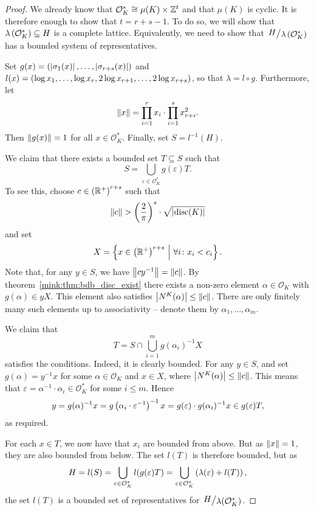 \begin{proof}
We already know that $\mathcal{O}_K^* \cong \mu(K) \times \mathbb{Z}^t$ and
that $\mu(K)$ is cyclic. It is therefore enough to show that
$t = r+s-1$. To do so, we will show that
$\lambda \left(\mathcal{O}_K^*\right) \subseteq H$ is a complete lattice.
Equivalently, we need to show that
$\kvoc{H}{\lambda \br{\mathcal{O}_K^*}}$ has a bounded system of
representatives.

Set $g(x) = \left(\left\lvert \sigma_1(x)\right\rvert, \dots, \left\lvert \sigma_{r+s}(x)\right\rvert\right)$
and
$l(x) =
\left(\log x_1, \dots, \log x_r,
2 \log x_{r+1}, \dots, 2 \log x_{r+s}\right)$, so that
$\lambda = l \circ g$. Furthermore, let
\[
\left\lVert x\right\rVert = \prod_{i=1}^r x_i \cdot \prod_{i=1}^s x_{r+i}^2.
\]
Then $\left\lVert g(x)\right\rVert = 1$ for all $x \in \mathcal{O}_K^*$. Finally,
set $S = l^{-1}(H)$.

We claim that there exists a bounded set $T \subseteq S$ such that
\[
S = \bigcup_{\varepsilon \in \mathcal{O}_K^*} g(\varepsilon) T.
\]
To see this, choose $c \in \left(\mathbb{R}^+\right)^{r+s}$ such that
\[
\left\lVert c\right\rVert > \left(\frac{2}{\pi}\right)^s \cdot \sqrt{\left\lvert \operatorname{disc}(K)\right\rvert}
\]
and set
\[
X = \left\{x \in \left(\mathbb{R}^+\right)^{r+s}~\middle\vert~\forall i \colon x_i < c_i\right\}.
\]
Note that, for any $y \in S$, we have $\left\lVert cy^{-1}\right\rVert = \left\lVert c\right\rVert$.
By theorem~\ref{mink:thm:bdb_disc_exist} there exists a non-zero
element $\alpha \in \mathcal{O}_K$ with $g(\alpha) \in yX$. This
element also satisfies $\left\lvert N^K(\alpha)\right\rvert \leq \left\lVert c\right\rVert$. There are
only finitely many such elements up to associativity -- denote them
by $\alpha_1, \dots, \alpha_m$.

We claim that
\[
T = S \cap \bigcup_{i=1}^m g(\alpha_i)^{-1} X
\]
satisfies the conditions. Indeed, it is clearly bounded. For any
$y \in S$, and set $g(\alpha) = y^{-1} x$ for some
$\alpha \in \mathcal{O}_K$ and $x \in X$, where
$\left\lvert N^K(\alpha)\right\rvert \leq \left\lVert c\right\rVert$. This means that
$\varepsilon = \alpha^{-1} \cdot \alpha_i \in \mathcal{O}_K^*$ for
some $i \leq m$. Hence
\[
y =
g(\alpha)^{-1} x =
g \left(\alpha_i \cdot \varepsilon^{-1}\right)^{-1} x =
g(\varepsilon) \cdot g(\alpha_i)^{-1} x \in
g(\varepsilon) T,
\]
as required.

For each $x \in T$, we now have that $x_i$ are bounded from above.
But as $\left\lVert x\right\rVert = 1$, they are also bounded from below. The set
$l(T)$ is therefore bounded, but as
\[
H =
l(S) =
\bigcup_{\varepsilon \in \mathcal{O}_K^*} l(g(\varepsilon) T) =
\bigcup_{\varepsilon \in \mathcal{O}_K^*}
\left(\lambda(\varepsilon) + l(T)\right),
\]
the set $l(T)$ is a bounded set of representatives for
$\kvoc{H}{\lambda(\mathcal{O}_K^*)}$.
\end{proof}
